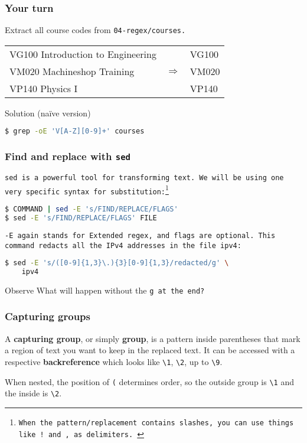 \begin{frame}[fragile]
\frametitle{Your turn}
Extract all course codes from \tt{04-regex/courses}. \newline

\begin{example}
    \begin{tabular}{lcl}
        VG100 Introduction to Engineering & & VG100 \\
        VM020 Machineshop Training & $\Longrightarrow$ & VM020 \\
        VP140 Physics I & & VP140
    \end{tabular}
\end{example}
\pause
\begin{block}{Solution (naïve version)}
\begin{lstlisting}[language=bash]
$ grep -oE 'V[A-Z][0-9]+' courses
\end{lstlisting}
\end{block}
\end{frame}

\begin{frame}[fragile]
\frametitle{Find and replace with \tt{sed}}
\tt{sed} is a powerful tool for transforming text.
We will be using one very specific syntax for substitution:\footnote{
    When the pattern/replacement contains slashes, you can use things like
    \tt{!} and \tt{,} as delimiters.
}
\begin{lstlisting}[language=bash]
$ COMMAND | sed -E 's/FIND/REPLACE/FLAGS'
$ sed -E 's/FIND/REPLACE/FLAGS' FILE
\end{lstlisting}
\tt{-E} again stands for Extended regex, and flags are optional.
This command redacts all the IPv4 addresses in the file \tt{ipv4}:
\begin{lstlisting}[language=bash]
$ sed -E 's/([0-9]{1,3}\.){3}[0-9]{1,3}/redacted/g' \
    ipv4
\end{lstlisting}
\begin{block}{Observe}
    What will happen without the \tt{g} at the end?
\end{block}
\end{frame}

\begin{frame}[fragile]
\frametitle{Capturing groups}
A \textbf{capturing group}, or simply \textbf{group}, is a pattern inside
parentheses that mark a region of text you want to keep in the replaced text.
\newline \newline
It can be accessed with a respective \textbf{backreference} which looks like
\verb|\1|, \verb|\2|, up to \verb|\9|.

When nested, the position of \verb|(| determines order, so the outside group is
\verb|\1| and the inside is \verb|\2|.
\end{frame}

